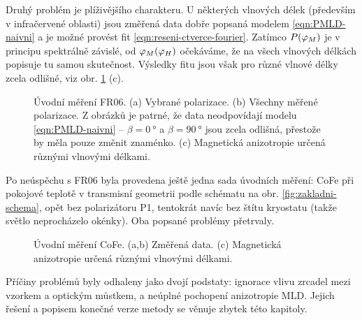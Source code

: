 Druhý problém je plíživějšího charakteru.
U některých vlnových délek (především v infračervené oblasti) jsou změřená data dobře popsaná modelem \eqref{eqn:PMLD-naivni} a je možné provést fit \eqref{eqn:reseni-ctverce-fourier}.
Zatímco $P(\varphi_M)$ je v principu spektrálně závislé, od $\varphi_M(\varphi_H)$ očekáváme, že na všech vlnových délkách popisuje tu samou skutečnost.
Výsledky fitu jsou však pro různé vlnové délky zcela odlišné, viz obr. \ref{fig:g-ferh-uvod-data} (c).


\begin{figure}[htbp]
    \centering
    \caption{Úvodní měření FR06. (a) Vybrané polarizace. (b) Všechny měřené polarizace. Z obrázků je patrné, že data neodpovídají modelu \eqref{eqn:PMLD-naivni} -- $\beta=\SI{0}{\degree}$ a $\beta=\SI{90}{\degree}$ jsou zcela odlišná, přestože by měla pouze změnit znaménko. (c) Magnetická anizotropie určená různými vlnovými délkami.}
    \label{fig:g-ferh-uvod-data}
\end{figure}

Po neúspěchu s FR06 byla provedena ještě jedna sada úvodních měření: CoFe při pokojové teplotě v transmisní geometrii podle schématu na obr. \ref{fig:zakladni-schema}, opět bez polarizátoru P1, tentokrát navíc bez štítu kryostatu (takže světlo neprocházelo okénky).
Oba popsané problémy přetrvaly.

\begin{figure}[htbp]
    \centering
    \caption{Úvodní měření CoFe. (a,b) Změřená data. (c) Magnetická anizotropie určená různými vlnovými délkami.}
    \label{fig:g-cofe-uvod-data}
\end{figure}

Příčiny problémů byly odhaleny jako dvojí podstaty: ignorace vlivu zrcadel mezi vzorkem a optickým můstkem, a neúplné pochopení anizotropie MLD.
Jejich řešení a popisem konečné verze metody se věnuje zbytek této kapitoly.
